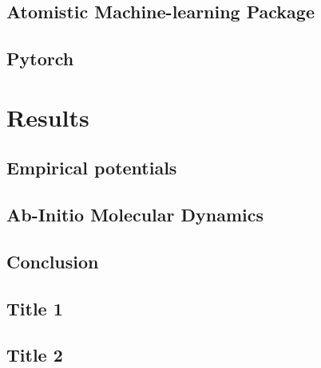 \documentclass[12pt]{report}
\begin{document}
\chapter{Atomistic Machine-learning Package}


\chapter{Pytorch}

\part{Results}

\chapter{Empirical potentials}

\chapter{Ab-Initio Molecular Dynamics}

\chapter{Conclusion}


\begin{appendices}

\chapter{Title 1}

\chapter{Title 2}

\end{appendices}

\printbibliography
\end{document}
